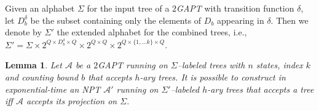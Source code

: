 \documentclass{LMCS}
\theoremstyle{plain}
\def \A             {\mathcal{A}}
\def \NPT           {\emph{NPT}\xspace}
\def \TGAPT         {\emph{$2$GAPT}\xspace}
\newtheorem{lemma}{Lemma}
\begin{document}
Given an alphabet $\Sigma$ for the input tree of a \TGAPT with transition
function $\delta$, let $D_b^{\delta}$ be the subset containing only the
elements of $D_b$ appearing in $\delta$. Then we denote by $\Sigma'$ the
extended alphabet for the combined trees, i.e., $\Sigma' = \Sigma \times 2^{Q
\times D_b^{\delta} \times Q} \times 2^{Q \times Q} \times 2^{Q \times
\{1,\ldots k\} \times Q}$.

\begin{lemma}\label{lem:FromTgaptToNpt}
Let $\A$ be a \TGAPT running on $\Sigma$--labeled trees with $n$
states, index $k$ and counting bound $b$ that accepts $h$-ary
trees. It is possible to construct in exponential-time an \NPT
$\A'$ running on $\Sigma'$--labeled $h$-ary trees that accepts a
tree iff $\A$ accepts its projection on $\Sigma$.
\end{lemma}
\end{document}
